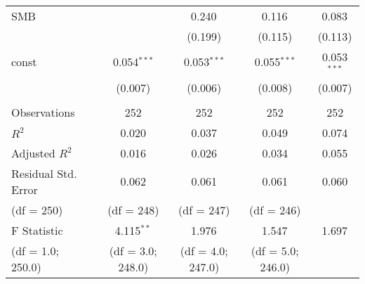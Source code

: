 \begin{table}[H]
\begin{tabular}{@{\extracolsep{5pt}}lcccc}
    SMB                 &                                                                                                  & 0.240$^{}$        & 0.116$^{}$        & 0.083$^{}$    \\
                        &                                                                                                  & (0.199)           & (0.115)           & (0.113)       \\
    const               & 0.054$^{***}$                                                                                    & 0.053$^{***}$     & 0.055$^{***}$     & 0.053$^{***}$ \\
                        & (0.007)                                                                                          & (0.006)           & (0.008)           & (0.007)       \\
    \hline                                                                                                                                                                         \\[-1.8ex]
    Observations        & 252                                                                                              & 252               & 252               & 252           \\
    $R^2$               & 0.020                                                                                            & 0.037             & 0.049             & 0.074         \\
    Adjusted $R^2$      & 0.016                                                                                            & 0.026             & 0.034             & 0.055         \\
    Residual Std. Error & 0.062                                                                                            & 0.061             & 0.061             & 0.060         \\
    (df = 250)          & (df = 248)                                                                                       & (df = 247)        & (df = 246)                        \\
    F Statistic         & 4.115$^{**}$                                                                                     & 1.976$^{}$        & 1.547$^{}$        & 1.697$^{}$    \\
    (df = 1.0; 250.0)   & (df = 3.0; 248.0)                                                                                & (df = 4.0; 247.0) & (df = 5.0; 246.0)                 \\

\end{tabular}
\end{table}
